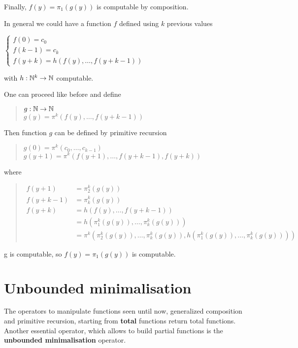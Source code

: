 Finally, $f(y) = \pi_1(g(y))$ is computable by composition.

\medskip

In general we could have a function $f$ defined using $k$ previous values

$\begin{cases}
  f(0) = c_0   \\
  f(k-1) = c_k \\
  f(y+k) = h(f(y),\dots,f(y+k-1))
\end{cases}$

with $h:\mathbb{N}^k\rightarrow\mathbb{N}$ computable.

One can proceed like before and define

\begin{quote}
  $g:\mathbb{N}\rightarrow\mathbb{N}$\\
  $g(y) = \pi^k(f(y),\dots,f(y+k-1))$
\end{quote}

Then function $g$ can be defined by primitive recursion

\begin{quote}
  $g(0) = \pi^k(c_0,\dots,c_{k-1})$\\
  $g(y+1) = \pi^k(f(y+1),\dots,f(y+k-1),f(y+k))$
\end{quote}
where
\begin{quote}
  $\begin{array}{ll}
     f(y+1) & = \pi_2^k(g(y))\\
     f(y+k-1) & = \pi_k^k(g(y))\\
     f(y+k) & = h(f(y),\dots,f(y+k-1)) \\
            & = h(\pi_1^k(g(y)),\dots,\pi_k^k(g(y)))\\
            & = \pi^k(\pi_2^k(g(y)),\dots,\pi_k^k(g(y)),h(\pi_1^k(g(y)),\dots,\pi_k^k(g(y))))
   \end{array}
   $
 \end{quote}

 g is computable, so $f(y) = \pi_1(g(y))$ is computable.

\section{Unbounded minimalisation}
The operators to manipulate functions seen until now, generalized composition and primitive recursion, starting from \textbf{total} functions return total functions. 
Another essential operator, which allows to build partial functions is the \textbf{unbounded minimalisation} operator.

